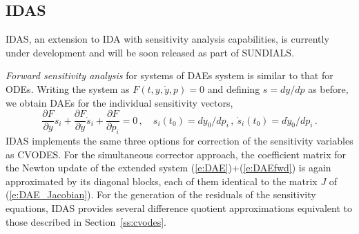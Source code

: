 
\subsection{IDAS}\label{ss:idas}

IDAS, an extension to IDA with sensitivity analysis capabilities, is
currently under development and will be soon released as part of SUNDIALS.

{\em Forward sensitivity analysis} for systems of DAEs system is similar to that
for ODEs.  Writing the system as $F(t,y,\dot{y},p)=0$ and defining
$s={dy}/{dp}$ as before, we obtain DAEs for the individual sensitivity vectors,
%
\begin{equation}\label{e:DAEfwd}
  \frac{\partial F}{\partial y} s_i + \frac{\partial F}{\partial \dot{y}} \dot{s}_i
  + \frac{\partial F}{\partial p_i}  = 0 \, , \quad
  s_i(t_0) = dy_0 / dp_i \, , ~ \dot{s}_i(t_0) = d\dot{y}_0 / dp_i \, .
\end{equation}
%
IDAS implements the same three options for correction of the sensitivity
variables as CVODES. For the simultaneous corrector approach, the coefficient
matrix for the Newton update of the extended system (\ref{e:DAE})+(\ref{e:DAEfwd})
is again approximated by its diagonal blocks, each of them identical to the
matrix $J$ of (\ref{e:DAE_Jacobian}). For the generation of the residuals of the sensitivity
equations, IDAS provides several difference quotient approximations equivalent
to those described in Section~\ref{ss:cvodes}.

